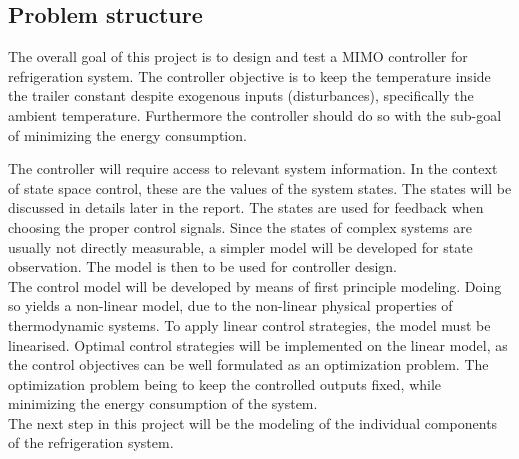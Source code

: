 \subsection{Problem structure}
The overall goal of this project is to design and test a MIMO controller for refrigeration system. The controller objective is to keep the temperature inside the trailer constant despite exogenous inputs (disturbances), specifically the ambient temperature. 
Furthermore the controller should do so with the sub-goal of minimizing the energy consumption.

The controller will require access to relevant system information. In the context of state space control, these are the values of the system states. The states will be discussed in details later in the report. The states are used for feedback when choosing the proper control signals. Since the states of complex systems are usually not directly measurable, a simpler model will be developed for state observation. The model is then to be used for controller design. \\

The control model will be developed by means of first principle modeling. Doing so yields a non-linear model, due to the non-linear physical properties of thermodynamic systems. To apply linear control strategies, the model must be linearised. Optimal control strategies will be implemented on the linear model, as the control objectives can be well formulated as an optimization problem. The optimization problem being to keep the controlled outputs fixed, while minimizing the energy consumption of the system.\\

The next step in this project will be the modeling of the individual components of the refrigeration system.




		
